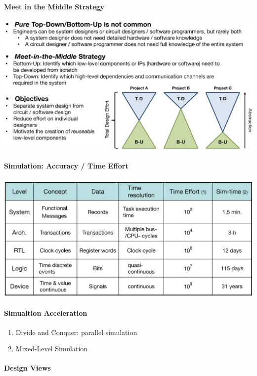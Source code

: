 \documentclass[english]{latex4ei/latex4ei_sheet}
\begin{document}
\paragraph{Meet in the Middle Strategy}

\begin{center}
  \includegraphics[width=0.8\linewidth]{assets/MeetInTheMiddle.png}
\end{center}

\paragraph{Simulation: Accuracy / Time Effort}

\begin{center}
  \includegraphics[width=0.8\linewidth]{assets/SimulationAccuracyTime.png}
\end{center}
 
\paragraph{Simualtion Acceleration}
\begin{enumerate}
	\item Divide and Conquer: parallel simulation
	\item Mixed-Level Simulation
\end{enumerate}
 
\paragraph{Design Views}
\end{document}
